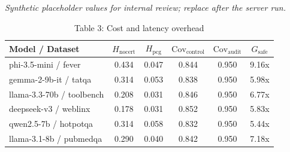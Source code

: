 

\begin{table}[h]
\centering
\small
  \textit{Synthetic placeholder values for internal review; replace after the server run.}
\caption{Table 3: Cost and latency overhead}
\label{tab:cost_overhead_main}
\begin{tabular}{l|cc|cc|c}
\hline
Model / Dataset & $H_{\mathrm{nocert}}$ & $H_{\mathrm{pcg}}$ & $\mathrm{Cov}_{\mathrm{control}}$ & $\mathrm{Cov}_{\mathrm{audit}}$ & $G_{\mathrm{safe}}$ \\
\hline
phi-3.5-mini / fever & 0.434 & 0.047 & 0.844 & 0.950 & 9.16x \\
gemma-2-9b-it / tatqa & 0.314 & 0.053 & 0.838 & 0.950 & 5.98x \\
llama-3.3-70b / toolbench & 0.208 & 0.031 & 0.846 & 0.950 & 6.77x \\
deepseek-v3 / weblinx & 0.178 & 0.031 & 0.852 & 0.950 & 5.83x \\
qwen2.5-7b / hotpotqa & 0.314 & 0.058 & 0.832 & 0.950 & 5.44x \\
llama-3.1-8b / pubmedqa & 0.290 & 0.040 & 0.842 & 0.950 & 7.18x \\
\hline
\end{tabular}
\end{table}
